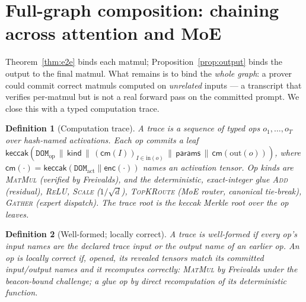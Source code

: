 \documentclass[11pt]{article}
\newtheorem{definition}{Definition}
\newcommand{\keccak}{\mathsf{keccak}}
\begin{document}
\section{Full-graph composition: chaining across attention and MoE}\label{sec:graph}

Theorem~\ref{thm:e2e} binds each matmul; Proposition~\ref{prop:output} binds the output to the
final matmul. What remains is to bind the \emph{whole graph}: a prover could commit correct matmuls
computed on \emph{unrelated} inputs --- a transcript that verifies per-matmul but is not a real
forward pass on the committed prompt. We close this with a typed computation trace.

\begin{definition}[Computation trace]
A trace is a sequence of typed ops $o_1,\dots,o_T$ over hash-named activations. Each op commits a
leaf $\keccak(\texttt{DOM}_{\mathrm{op}}\,\|\,\mathsf{kind}\,\|\,(\mathsf{cm}(I))_{I\in\mathrm{in}(o)}\,\|\,\mathsf{params}\,\|\,\mathsf{cm}(\mathrm{out}(o)))$,
where $\mathsf{cm}(\cdot)=\keccak(\texttt{DOM}_{\mathrm{act}}\|\mathsf{enc}(\cdot))$ names an activation
tensor. Op kinds are \textsc{MatMul} (verified by Freivalds), and the deterministic, exact-integer
glue \textsc{Add} (residual), \textsc{ReLU}, \textsc{Scale} ($1/\sqrt d$), \textsc{TopKRoute} (MoE
router, canonical tie-break), \textsc{Gather} (expert dispatch). The trace root is the keccak Merkle
root over the op leaves.
\end{definition}

\begin{definition}[Well-formed; locally correct]
A trace is \emph{well-formed} if every op's input names are the declared trace input or the output
name of an earlier op. An op is \emph{locally correct} if, opened, its revealed tensors match its
committed input/output names and it recomputes correctly: \textsc{MatMul} by Freivalds under the
beacon-bound challenge; a glue op by direct recomputation of its deterministic function.
\end{definition}
\end{document}
